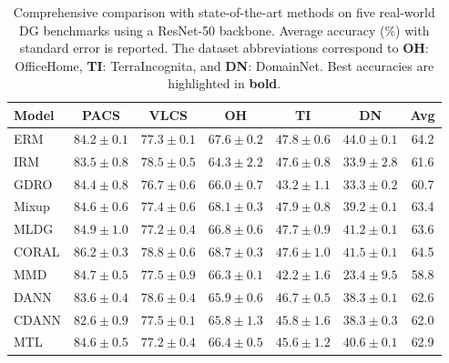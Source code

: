 \begin{table}[t]
\caption{
    Comprehensive comparison with state-of-the-art methods on five real-world DG benchmarks using a ResNet-50 backbone. 
    Average accuracy (\%) with standard error is reported. 
    The dataset abbreviations correspond to \textbf{OH}: OfficeHome, \textbf{TI}: TerraIncognita, and \textbf{DN}: DomainNet.
    Best accuracies are highlighted in \textbf{bold}.}
\label{tab:real_results}
\centering
\begingroup %
\footnotesize %
\renewcommand{\arraystretch}{0.4} %
\begin{tabular}{lcccccc}
\toprule
\textbf{Model} & \textbf{PACS} & \textbf{VLCS} & \textbf{OH} & \textbf{TI} & \textbf{DN} & \textbf{Avg} \\
\midrule
ERM \citep{vapnik1999nature} & $84.2 \pm 0.1$ & $77.3 \pm 0.1$ & $67.6 \pm 0.2$ & $47.8 \pm 0.6$ & $44.0 \pm 0.1$ & 64.2 \\
IRM \citep{arjovsky2019invariant} & $83.5 \pm 0.8$ & $78.5 \pm 0.5$ & $64.3 \pm 2.2$ & $47.6 \pm 0.8$ & $33.9 \pm 2.8$ & 61.6 \\
GDRO \citep{sagawa2019distributionally} & $84.4 \pm 0.8$ & $76.7 \pm 0.6$ & $66.0 \pm 0.7$ & $43.2 \pm 1.1$ & $33.3 \pm 0.2$ & 60.7 \\
Mixup \citep{zhang2018mixup} & $84.6 \pm 0.6$ & $77.4 \pm 0.6$ & $68.1 \pm 0.3$ & $47.9 \pm 0.8$ & $39.2 \pm 0.1$ & 63.4 \\
MLDG \citep{li2018learning_meta} & $84.9 \pm 1.0$ & $77.2 \pm 0.4$ & $66.8 \pm 0.6$ & $47.7 \pm 0.9$ & $41.2 \pm 0.1$ & 63.6 \\
CORAL \citep{sun2016deep} & $86.2 \pm 0.3$ & $78.8 \pm 0.6$ & $68.7 \pm 0.3$ & $47.6 \pm 1.0$ & $41.5 \pm 0.1$ & 64.5 \\
MMD \citep{li2018domain_mmd} & $84.7 \pm 0.5$ & $77.5 \pm 0.9$ & $66.3 \pm 0.1$ & $42.2 \pm 1.6$ & $23.4 \pm 9.5$ & 58.8 \\
DANN \citep{ganin2016domain} & $83.6 \pm 0.4$ & $78.6 \pm 0.4$ & $65.9 \pm 0.6$ & $46.7 \pm 0.5$ & $38.3 \pm 0.1$ & 62.6 \\
CDANN \citep{li2018deep_cdann} & $82.6 \pm 0.9$ & $77.5 \pm 0.1$ & $65.8 \pm 1.3$ & $45.8 \pm 1.6$ & $38.3 \pm 0.3$ & 62.0 \\
MTL \citep{blanchard2021domain} & $84.6 \pm 0.5$ & $77.2 \pm 0.4$ & $66.4 \pm 0.5$ & $45.6 \pm 1.2$ & $40.6 \pm 0.1$ & 62.9 \\

\end{tabular}
\end{table}
